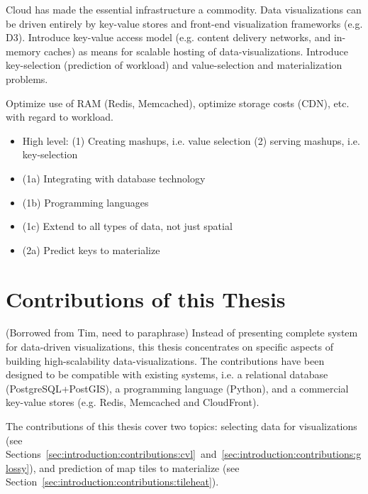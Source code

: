 \documentclass[11pt, oneside]{report}
\begin{document}
Cloud has made the essential infrastructure a commodity. Data visualizations can be driven entirely by key-value stores and front-end visualization frameworks (e.g. D3). Introduce key-value access model (e.g. content delivery networks, and in-memory caches) as means for scalable hosting of data-visualizations. Introduce key-selection (prediction of workload) and value-selection and materialization problems.

Optimize use of RAM (Redis, Memcached), optimize storage costs (CDN), etc. with regard to workload.

\begin{itemize}
\item High level: (1) Creating mashups, i.e. value selection (2) serving mashups, i.e. key-selection
\item (1a) Integrating with database technology
\item (1b) Programming languages
\item (1c) Extend to all types of data, not just spatial
\item (2a) Predict keys to materialize 
\end{itemize}


\section{Contributions of this Thesis}
\label{sec:introduction:contributions}

(Borrowed from Tim, need to paraphrase) Instead of presenting complete system for data-driven visualizations, this thesis concentrates on specific aspects of building high-scalability data-visualizations. The contributions have been designed to be compatible with existing systems, i.e. a relational database (PostgreSQL+PostGIS), a programming language (Python), and a commercial key-value stores (e.g. Redis, Memcached and CloudFront).

The contributions of this thesis cover two topics: selecting data for visualizations (see Sections~\ref{sec:introduction:contributions:cvl}~and~\ref{sec:introduction:contributions:glossy}), and prediction of map tiles to materialize (see Section~\ref{sec:introduction:contributions:tileheat}).
\end{document}

